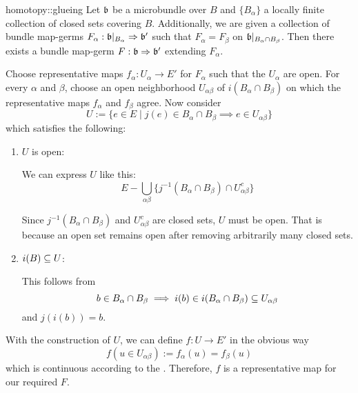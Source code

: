 \begin{mylemma}{homotopy::glueing}
    Let $\mathfrak{b}$ be a microbundle over $B$ and $\{B_\alpha\}$ a locally finite collection of closed sets covering $B$.
    Additionally, we are given a collection of bundle map-germs $F_\alpha: \mathfrak{b}\vert_{B_\alpha} \Rightarrow{} \mathfrak{b}'$
    such that $F_\alpha = F_\beta$ on $\mathfrak{b}\vert_{B_\alpha \cap B_\beta}$.
    Then there exists a bundle map-germ $F: \mathfrak{b} \Rightarrow{} \mathfrak{b}'$ extending $F_\alpha$.
\end{mylemma}
\begin{myproof}
    Choose representative maps $f_\alpha: U_\alpha \to E'$ for $F_\alpha$ such that the $U_\alpha$ are open.
    For every $\alpha$ and $\beta$, choose an open neighborhood $U_{\alpha\beta}$ of $i(B_\alpha \cap B_\beta)$ on which the representative maps $f_\alpha$ and $f_\beta$ agree.
    Now consider
    \[ U := \{ e \in E \mid j(e) \in B_\alpha \cap B_\beta \implies e \in U_{\alpha\beta} \}\]
    which satisfies the following:
    \begin{enumerate}
        \item $U$ is open:

        We can express $U$ like this:
        \[ E - \bigcup_{\alpha\beta} \{ j^{-1}(B_\alpha \cap B_\beta) \cap U_{\alpha\beta}^c \} \]
        
        Since $j^{-1}(B_\alpha \cap B_\beta)$ and $U_{\alpha\beta}^c$ are closed sets, $U$ must be open.
        That is because an open set remains open after removing arbitrarily many closed sets.
        \item $i(B) \subseteq{} U$:
        
        This follows from
        \[ b \in B_\alpha \cap B_\beta \implies i(b) \in i(B_\alpha \cap B_\beta) \subseteq{} U_{\alpha\beta} \]
        and $j(i(b)) = b$.
    \end{enumerate}
    With the construction of $U$, we can define $f: U \to E'$ in the obvious way
    \[ f(u \in U_{\alpha\beta}) := f_\alpha(u) = f_\beta(u) \]
    which is continuous according to the .
    Therefore, $f$ is a representative map for our required $F$.
\end{myproof}